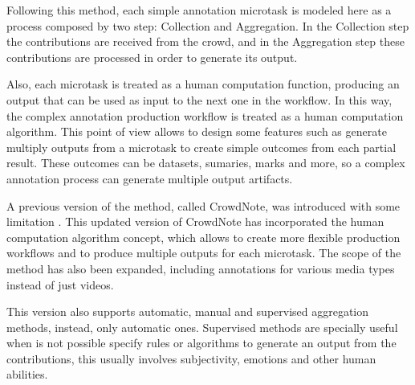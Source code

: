 




Following this method, each simple annotation microtask is modeled here as a process composed by two step: Collection and Aggregation. In the Collection step the contributions are received from the crowd, and in the Aggregation step these  contributions are processed in order to generate its output. 

Also, each microtask is treated as a human computation function, producing an output that can be used as input to the next one in the workflow. In this way, the complex annotation production workflow is treated as a human computation algorithm. This point of view allows to design some features such as generate multiply outputs from a microtask to create simple outcomes from each partial result. These outcomes can be datasets, sumaries, marks and more, so a complex annotation process can generate multiple output artifacts.

A previous version of the method, called CrowdNote, was introduced with some limitation \citep{172450}. This updated version of CrowdNote has incorporated the human computation algorithm concept, which allows to create more flexible production workflows and to produce multiple outputs for each microtask. The scope of the method has also been expanded, including annotations for various media types instead of just videos.

This version also supports automatic, manual and supervised aggregation methods, instead, only automatic ones. Supervised methods are specially useful when is not possible specify rules or algorithms to generate an output from the contributions, this usually involves subjectivity, emotions and other human abilities.

